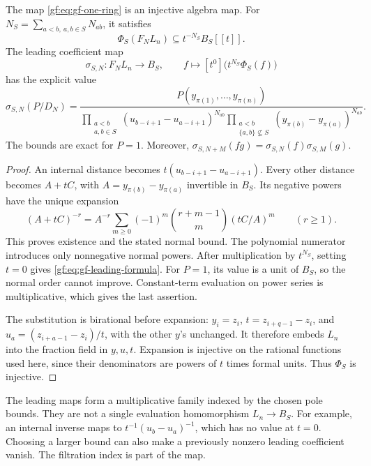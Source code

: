 \begin{theorem}\label{gf:thm:gf-single-poles}
The map \eqref{gf:eq:gf-one-ring} is an injective algebra map.
For
\(N_S=\sum_{a<b,\ a,b\in S}N_{ab}\), it satisfies
\[
 \Phi_S(F_NL_n)\subseteq t^{-N_S}B_S[[t]].
\]
The leading coefficient map
\begin{equation}\label{gf:eq:gf-leading}
 \sigma_{S,N}:F_NL_n\longrightarrow B_S,
 \qquad f\longmapsto[t^0]\bigl(t^{N_S}\Phi_S(f)\bigr)
\end{equation}
has the explicit value
\begin{equation}\label{gf:eq:gf-leading-formula}
 \sigma_{S,N}(P/D_N)=
 \frac{P(y_{\pi(1)},\ldots,y_{\pi(n)})}
 {\displaystyle
  \prod_{\substack{a<b\\a,b\in S}}(u_{b-i+1}-u_{a-i+1})^{N_{ab}}
  \prod_{\substack{a<b\\\{a,b\}\not\subseteq S}}
             (y_{\pi(b)}-y_{\pi(a)})^{N_{ab}}}.
\end{equation}
The bounds are exact for \(P=1\).
Moreover,
\(\sigma_{S,N+M}(fg)=\sigma_{S,N}(f)\sigma_{S,M}(g)\).
\end{theorem}

\begin{proof}
An internal distance becomes
\(t(u_{b-i+1}-u_{a-i+1})\).
Every other distance becomes \(A+tC\), with
\(A=y_{\pi(b)}-y_{\pi(a)}\) invertible in \(B_S\).
Its negative powers have the unique expansion
\begin{equation}\label{gf:eq:gf-binomial}
 (A+tC)^{-r}
 =A^{-r}\sum_{m\geq0}(-1)^m\binom{r+m-1}{m}(tC/A)^m
 \qquad(r\geq1).
\end{equation}
This proves existence and the stated normal bound.  The polynomial
numerator introduces only nonnegative normal powers.
After multiplication by \(t^{N_S}\), setting \(t=0\)
gives \eqref{gf:eq:gf-leading-formula}.
For \(P=1\), its value is a unit of \(B_S\), so the
normal order cannot improve.  Constant-term evaluation on power
series is multiplicative, which gives the last assertion.

The substitution is birational before expansion:
\(y_i=z_i\), \(t=z_{i+q-1}-z_i\), and
\(u_a=(z_{i+a-1}-z_i)/t\), with the other \(y\)'s unchanged.
It therefore embeds \(L_n\) into the fraction field in \(y,u,t\).
Expansion is injective on the rational functions used here, since
their denominators are powers of \(t\) times formal units.
Thus \(\Phi_S\) is injective.
\end{proof}

The leading maps form a multiplicative family indexed by the chosen
pole bounds.  They are not a single evaluation homomorphism
\(L_n\to B_S\).  For example, an internal inverse maps to
\(t^{-1}(u_b-u_a)^{-1}\), which has no value at \(t=0\).
Choosing a larger bound can also make a previously nonzero leading
coefficient vanish.  The filtration index is part of the map.

